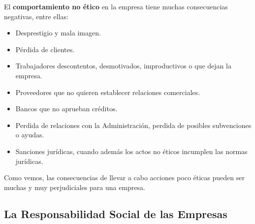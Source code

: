 El \textbf{comportamiento no ético} en la empresa tiene muchas consecuencias negativas, entre ellas:

\begin{itemize}
    \item Desprestigio y mala imagen.
    \item Pérdida de clientes.
    \item Trabajadores descontentos, desmotivados, improductivos o que dejan la empresa.
    \item Proveedores que no quieren establecer relaciones comerciales.
    \item Bancos que no aprueban créditos.
    \item Perdida de relaciones con la Administración, perdida de posibles subvenciones o ayudas.
    \item Sanciones jurídicas, cuando además los actos no éticos incumplen las normas jurídicas.
\end{itemize}

Como vemos, las consecuencias de llevar a cabo acciones poco éticas pueden ser muchas y muy perjudiciales para una empresa.

\subsection{La Responsabilidad Social de las Empresas}


\appendix








